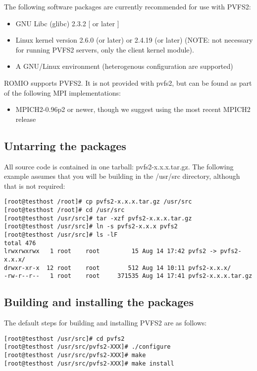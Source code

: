\documentclass[11pt, letterpaper]{article}
\begin{document}
The following software packages are currently recommended for use with PVFS2:
\begin{itemize}
\item GNU Libc (glibc) 2.3.2 [ or later ]
\item Linux kernel version 2.6.0 (or later) or 2.4.19 (or later) (NOTE: not
necessary for running PVFS2 servers, only the client kernel module).  
\item A GNU/Linux environment (heterogenous configuration are
supported)
\end{itemize}

ROMIO supports PVFS2.  It is not provided with pvfs2, but can be found
as part of the following MPI implementations:

\begin{itemize}
\item MPICH2-0.96p2 or newer, though we suggest using the most recent MPICH2
release
\end{itemize}

\subsection{Untarring the packages}

All source code is contained in one tarball: pvfs2-x.x.x.tar.gz.  The
following example assumes that you will be building in the /usr/src
directory, although that is not required:

\begin{verbatim}
[root@testhost /root]# cp pvfs2-x.x.x.tar.gz /usr/src
[root@testhost /root]# cd /usr/src
[root@testhost /usr/src]# tar -xzf pvfs2-x.x.x.tar.gz
[root@testhost /usr/src]# ln -s pvfs2-x.x.x pvfs2
[root@testhost /usr/src]# ls -lF
total 476
lrwxrwxrwx   1 root    root         15 Aug 14 17:42 pvfs2 -> pvfs2-x.x.x/
drwxr-xr-x  12 root    root        512 Aug 14 10:11 pvfs2-x.x.x/
-rw-r--r--   1 root    root     371535 Aug 14 17:41 pvfs2-x.x.x.tar.gz
\end{verbatim}

\subsection{Building and installing the packages}

The default steps for building and installing PVFS2 are as follows:

\begin{verbatim}
[root@testhost /usr/src]# cd pvfs2
[root@testhost /usr/src/pvfs2-XXX]# ./configure
[root@testhost /usr/src/pvfs2-XXX]# make
[root@testhost /usr/src/pvfs2-XXX]# make install
\end{verbatim}
\end{document}

